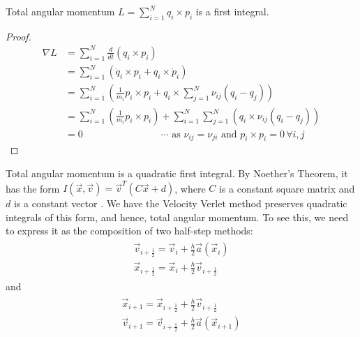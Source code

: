 \documentclass[../Main.tex]{subfiles}
\begin{document}
\begin{theorem} Total angular momentum $L = \sum_{i=1}^{N} q_{i} \times p_{i}$ is a first integral. \end{theorem}
\begin{proof}
\begin{align*}
\nabla L & = \sum_{i=1}^{N} \frac{d}{dt} \left(q_{i} \times p_{i}\right) \\
& = \sum_{i=1}^{N} \left(\dot{q}_{i} \times p_{i} + {q}_{i} \times \dot{p}_{i}\right) \\  
& = \sum_{i=1}^{N} \left( \frac{1}{m_{i}}p_{i} \times p_{i} + q_{i} \times \sum_{j=1}^{N}\nu_{ij}\left(q_{i} - q_{j}\right)\right) \\  
& = \sum_{i=1}^{N} \left( \frac{1}{m_{i}}p_{i} \times p_{i}\right) +  \sum_{i=1}^{N}\sum_{j=1}^{N} \left(q_{i} \times \nu_{ij}\left(q_{i} - q_{j}\right)\right) \\
& = 0  \qquad \qquad \qquad \qquad \cdots \mbox{ as }\nu_{ij} = \nu_{ji} \mbox{ and } p_{i} \times p_{i} = 0 \,\forall i, j
\end{align*}
\end{proof}

Total angular momentum is a quadratic first integral. By Noether's Theorem, it has the form $I(\vec{x}, \vec{v}) = \vec{v}^{T}\left(C\vec{x} + d\right)$, where $C$ is a constant square matrix and $d$ is a constant vector \cite{HarierLubichWanner2003}.
We have the Velocity Verlet method preserves quadratic integrals of this form, and hence, total angular momentum. To see this, we need to express it as the composition of two half-step methods:
\begin{align}
	\begin{split}
		\vec{v}_{i+\frac{1}{2}} = \vec{v}_{i} + \frac{h}{2}\vec{a}(\vec{x}_{i}) \\
		\vec{x}_{i+\frac{1}{2}} = \vec{x}_{i} + \frac{h}{2}\vec{v}_{i+\frac{1}{2}}
	\end{split}
\end{align}
and
\begin{align}
	\begin{split}
		\vec{x}_{i+1} = \vec{x}_{i+ \frac{1}{2}} + \frac{h}{2}\vec{v}_{i+\frac{1}{2}} \\
		\vec{v}_{i+1} = \vec{v}_{i+\frac{1}{2}} + \frac{h}{2}\vec{a}(\vec{x}_{i+1})
	\end{split} \label{velocity_verlet_split_2}
\end{align}
\end{document}
